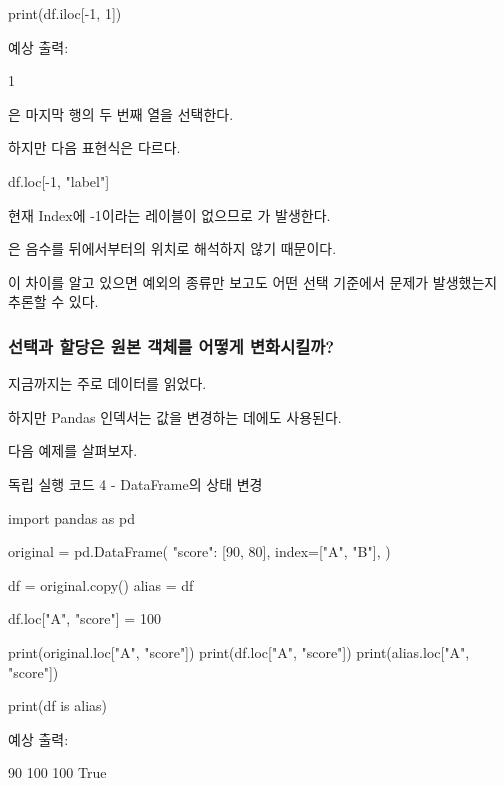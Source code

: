 \begin{dhkcode}
print(df.iloc[-1, 1])
\end{dhkcode}

예상 출력:

\begin{dhkzsh}
1
\end{dhkzsh}

은 마지막 행의 두 번째 열을 선택한다.

하지만 다음 표현식은 다르다.

\begin{dhkcode}
df.loc[-1, "label"]
\end{dhkcode}

현재 Index에 -1이라는 레이블이 없으므로 가 발생한다.

은 음수를 뒤에서부터의 위치로 해석하지 않기 때문이다.

이 차이를 알고 있으면 예외의 종류만 보고도 어떤 선택 기준에서 문제가 발생했는지 추론할 수 있다.

\subsubsection{선택과 할당은 원본 객체를 어떻게 변화시킬까?}

지금까지는 주로 데이터를 읽었다.

하지만 Pandas 인덱서는 값을 변경하는 데에도 사용된다.

다음 예제를 살펴보자.

\begin{dhknote}
\begin{dhksmry}[centered]
독립 실행 코드 4 - DataFrame의 상태 변경
\end{dhksmry}
\end{dhknote}

\begin{dhkcode}
import pandas as pd

original = pd.DataFrame(
    {"score": [90, 80]},
    index=["A", "B"],
)

df = original.copy()
alias = df

df.loc["A", "score"] = 100

print(original.loc["A", "score"])
print(df.loc["A", "score"])
print(alias.loc["A", "score"])

print(df is alias)
\end{dhkcode}

예상 출력:

\begin{dhkzsh}
90
100
100
True
\end{dhkzsh}

